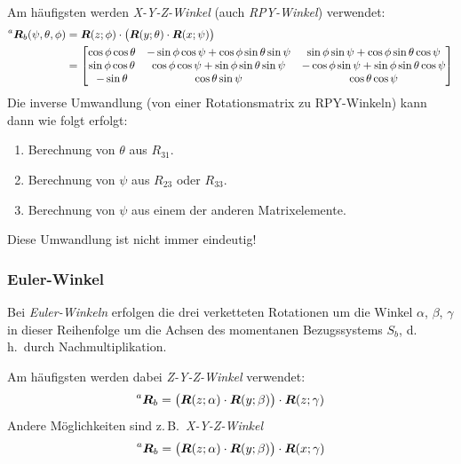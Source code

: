 \documentclass[a4paper, 11pt, accentcolor = tud3b]{tudreport}
\newcommand{\inreferenceto}[2]{\prescript{#1}{}{#2}}
\newcommand{\mat}[1]{\boldsymbol{#1}}
\renewcommand{\dh}{d.\,h.~}
\newcommand{\zB}{z.\,B.~}
\begin{document}
					Am häufigsten werden \emph{X-Y-Z-Winkel} (auch \emph{RPY-Winkel}) verwendet:
					\begin{align*}
						\inreferenceto{a}{\mat{R}}_b(\psi, \theta, \phi) &= \mat{R}(z; \phi) \cdot \big( \mat{R}(y; \theta) \cdot \mat{R}(x; \psi) \big) \\
							&=
								\begin{bmatrix}
									\cos\phi \cos\theta & -\sin\phi \cos\psi + \cos\phi \sin\theta \sin\psi & \sin\phi \sin\psi + \cos\phi \sin\theta \cos\psi  \\
									\sin\phi \cos\theta & \cos\phi \cos\psi + \sin\phi \sin\theta \sin\psi  & -\cos\phi \sin\psi + \sin\phi \sin\theta \cos\psi \\
									-\sin\theta         & \cos\theta \sin\psi                               & \cos\theta \cos\psi
								\end{bmatrix}
					\end{align*}
					Die inverse Umwandlung (von einer Rotationsmatrix zu RPY-Winkeln) kann dann wie folgt erfolgt:
					\begin{enumerate}
						\item Berechnung von \(\theta\) aus \( R_{31} \).
						\item Berechnung von \(\psi\) aus \( R_{23} \) oder \( R_{33} \).
						\item Berechnung von \(\psi\) aus einem der anderen Matrixelemente.
					\end{enumerate}
					Diese Umwandlung ist nicht immer eindeutig!

				\subsubsection{Euler-Winkel}
					Bei \emph{Euler-Winkeln} erfolgen die drei verketteten Rotationen um die Winkel \(\alpha\), \(\beta\), \(\gamma\) in dieser Reihenfolge um die Achsen des momentanen Bezugssystems \(S_b\), \dh durch Nachmultiplikation.
					
					Am häufigsten werden dabei \emph{Z-Y-Z-Winkel} verwendet:
					\begin{equation*}
						\inreferenceto{a}{\mat{R}}_b = \big( \mat{R}(z; \alpha) \cdot \mat{R}(y; \beta) \big) \cdot \mat{R}(z; \gamma)
					\end{equation*}
					Andere Möglichkeiten sind \zB \emph{X-Y-Z-Winkel}
					\begin{equation*}
						\inreferenceto{a}{\mat{R}}_b = \big( \mat{R}(z; \alpha) \cdot \mat{R}(y; \beta) \big) \cdot \mat{R}(x; \gamma)
					\end{equation*}
\end{document}
